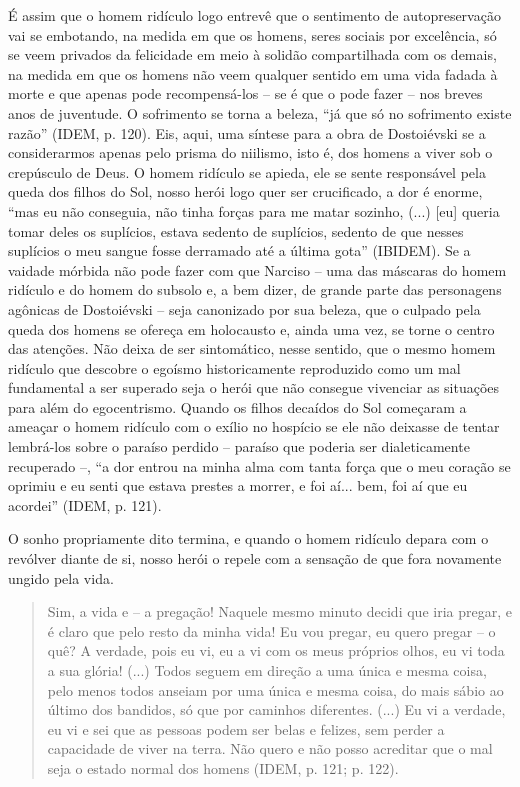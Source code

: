É assim que o homem ridículo logo entrevê que o sentimento de
autopreservação vai se embotando, na medida em que os homens, seres
sociais por excelência, só se veem privados da felicidade em meio à
solidão compartilhada com os demais, na medida em que os homens não veem
qualquer sentido em uma vida fadada à morte e que apenas pode
recompensá-los -- se é que o pode fazer -- nos breves anos de juventude.
O sofrimento se torna a beleza, ``já que só no sofrimento existe razão''
(IDEM, p. 120). Eis, aqui, uma síntese para a obra de Dostoiévski se a
considerarmos apenas pelo prisma do niilismo, isto é, dos homens a viver
sob o crepúsculo de Deus. O homem ridículo se apieda, ele se sente
responsável pela queda dos filhos do Sol, nosso herói logo quer ser
crucificado, a dor é enorme, ``mas eu não conseguia, não tinha forças
para me matar sozinho, (...) {[}eu{]} queria tomar deles os suplícios,
estava sedento de suplícios, sedento de que nesses suplícios o meu
sangue fosse derramado até a última gota'' (IBIDEM). Se a vaidade
mórbida não pode fazer com que Narciso -- uma das máscaras do homem
ridículo e do homem do subsolo e, a bem dizer, de grande parte das
personagens agônicas de Dostoiévski -- seja canonizado por sua beleza,
que o culpado pela queda dos homens se ofereça em holocausto e, ainda
uma vez, se torne o centro das atenções. Não deixa de ser sintomático,
nesse sentido, que o mesmo homem ridículo que descobre o egoísmo
historicamente reproduzido como um mal fundamental a ser superado seja o
herói que não consegue vivenciar as situações para além do egocentrismo.
Quando os filhos decaídos do Sol começaram a ameaçar o homem ridículo
com o exílio no hospício se ele não deixasse de tentar lembrá-los sobre
o paraíso perdido -- paraíso que poderia ser dialeticamente recuperado
--, ``a dor entrou na minha alma com tanta força que o meu coração se
oprimiu e eu senti que estava prestes a morrer, e foi aí... bem, foi aí
que eu acordei'' (IDEM, p. 121).

O sonho propriamente dito termina, e quando o homem ridículo depara com
o revólver diante de si, nosso herói o repele com a sensação de que fora
novamente ungido pela vida.

\begin{quote}
Sim, a vida e -- a pregação! Naquele mesmo minuto decidi que iria
pregar, e é claro que pelo resto da minha vida! Eu vou pregar, eu quero
pregar -- o quê? A verdade, pois eu vi, eu a vi com os meus próprios
olhos, eu vi toda a sua glória! (...) Todos seguem em direção a uma
única e mesma coisa, pelo menos todos anseiam por uma única e mesma
coisa, do mais sábio ao último dos bandidos, só que por caminhos
diferentes. (...) Eu vi a verdade, eu vi e sei que as pessoas podem ser
belas e felizes, sem perder a capacidade de viver na terra. Não quero e
não posso acreditar que o mal seja o estado normal dos homens (IDEM, p.
121; p. 122).
\end{quote}

